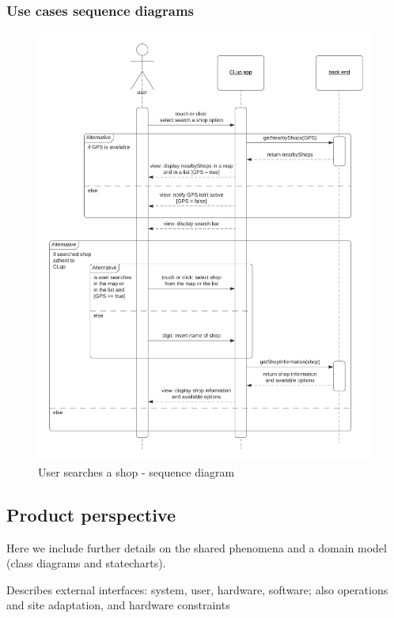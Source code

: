 \clearpage

\subsubsection{Use cases sequence diagrams}

\begin{figure}[h!]
    \centering
    \includegraphics[width=\textwidth]{Images/Use case - user searches a shop.png}
    \caption{\label{fig:usersearchesshop}User searches a shop - sequence diagram}
\end{figure}

\clearpage
\subsection{Product perspective}
\label{subsect:productperspective}

Here we include further details on the shared phenomena and a domain model (class diagrams and statecharts).

Describes external interfaces: system, user, hardware, software; also operations and site adaptation, and hardware constraints

